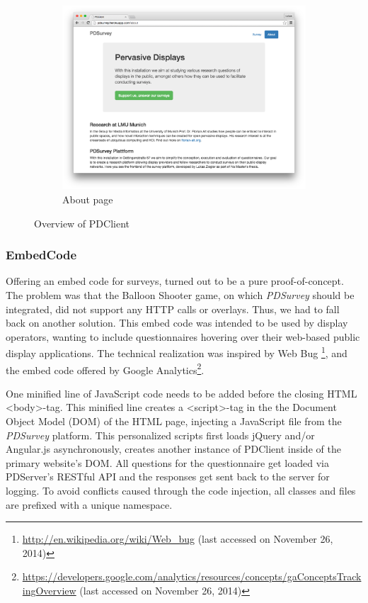\begin{figure}
		    \begin{subfigure}[b]{0.6\textwidth}
		        \centering
		        \includegraphics[width=\textwidth]{img/screenshots/pdclient/about}
		        \caption{About page}
		        \label{fig:4-pdclient-about}
		    \end{subfigure}
		    \caption{Overview of PDClient}
		    \label{fig:pdclient-screenshots}
		\end{figure}



	\subsubsection{EmbedCode}

		Offering an embed code for surveys, turned out to be a pure proof-of-concept. The problem was that the Balloon Shooter game, on which \textit{PDSurvey} should be integrated, did not support any HTTP calls or overlays. Thus, we had to fall back on another solution. This embed code was intended to be used by display operators, wanting to include questionnaires hovering over their web-based public display applications. The technical realization was inspired by Web Bug \footnote{\url{http://en.wikipedia.org/wiki/Web_bug} (last accessed on November 26, 2014)}, and the embed code offered by Google Analytics\footnote{\url{https://developers.google.com/analytics/resources/concepts/gaConceptsTrackingOverview} (last accessed on November 26, 2014)}.

		One minified line of JavaScript code needs to be added before the closing HTML <body>-tag. This minified line creates a <script>-tag in the the Document Object Model (DOM) of the HTML page, injecting a JavaScript file from the \textit{PDSurvey} platform. This personalized scripts first loads jQuery and/or Angular.js asynchronously, creates another instance of PDClient inside of the primary website's DOM. All questions for the questionnaire get loaded via PDServer's RESTful API and the responses get sent back to the server for logging. To avoid conflicts caused through the code injection, all classes and files are prefixed with a unique namespace.





